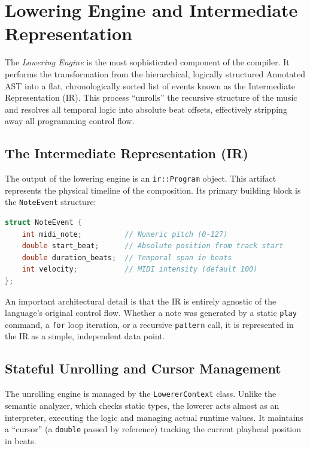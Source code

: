 \section{Lowering Engine and Intermediate Representation}\label{sec:lowering-ir}

The \textit{Lowering Engine} is the most sophisticated component of the compiler.
It performs the transformation from the hierarchical, logically structured Annotated AST into a flat, chronologically
sorted list of events known as the Intermediate Representation (IR).
This process ``unrolls'' the recursive structure of the music and resolves all temporal logic into absolute beat
offsets, effectively stripping away all programming control flow.

\subsection{The Intermediate Representation (IR)}\label{detail-subsec:the-intermediate-representation-(ir)}

The output of the lowering engine is an \texttt{ir::Program} object.
This artifact represents the physical timeline of the composition.
Its primary building block is the \texttt{NoteEvent} structure:

\begin{lstlisting}[language=C++, caption={Structure of an atomic IR event.},label={detail-lst:lstlisting2}]
struct NoteEvent {
    int midi_note;          // Numeric pitch (0-127)
    double start_beat;      // Absolute position from track start
    double duration_beats;  // Temporal span in beats
    int velocity;           // MIDI intensity (default 100)
};
\end{lstlisting}

An important architectural detail is that the IR is entirely agnostic of the language's original control flow.
Whether a note was generated by a static \texttt{play} command, a \texttt{for} loop iteration, or a recursive
\texttt{pattern} call, it is represented in the IR as a simple, independent data point.

\subsection{Stateful Unrolling and Cursor Management}\label{detail-subsec:stateful-unrolling-and-cursor-management}

The unrolling engine is managed by the \texttt{LowererContext} class.
Unlike the semantic analyzer, which checks static types, the lowerer acts almost as an interpreter, executing the logic
and managing actual runtime values.
It maintains a ``cursor'' (a \texttt{double} passed by reference) tracking the current playhead position in beats.

